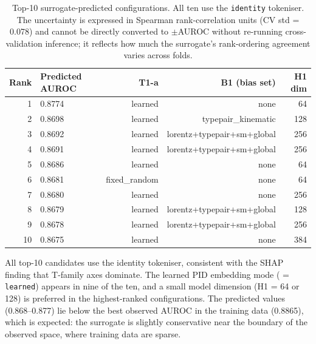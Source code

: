 \begin{table}[h]
  \centering\small
  \caption{Top-10 surrogate-predicted configurations. All ten use the
    \texttt{identity} tokeniser. The uncertainty is expressed in Spearman
    rank-correlation units (CV std = 0.078) and cannot be directly converted
    to $\pm$AUROC without re-running cross-validation inference; it reflects
    how much the surrogate's rank-ordering agreement varies across folds.}
  \label{tab:ch8_top10}
  \begin{tabular}{rlrrr}
    \toprule
    Rank & Predicted AUROC & T1-a & B1 (bias set) & H1 dim \\
    \midrule
    1  & 0.8774 & learned        & none                                                            & 64  \\
    2  & 0.8698 & learned        & typepair\_kinematic                                             & 128 \\
    3  & 0.8692 & learned        & lorentz+typepair+sm+global                                      & 256 \\
    4  & 0.8691 & learned        & lorentz+typepair+sm+global                                      & 256 \\
    5  & 0.8686 & learned        & none                                                            & 64  \\
    6  & 0.8681 & fixed\_random  & none                                                            & 64  \\
    7  & 0.8680 & learned        & none                                                            & 256 \\
    8  & 0.8679 & learned        & lorentz+typepair+sm+global                                      & 128 \\
    9  & 0.8678 & learned        & lorentz+typepair+sm+global                                      & 256 \\
    10 & 0.8675 & learned        & none                                                            & 384 \\
    \bottomrule
  \end{tabular}
\end{table}

All top-10 candidates use the identity tokeniser, consistent with the SHAP
finding that T-family axes dominate. The learned PID embedding mode
( = \texttt{learned}) appears in nine of the ten, and a small
model dimension (H1 = 64 or 128) is preferred in the highest-ranked configurations.
The predicted values (0.868--0.877) lie below the best observed AUROC in the
training data (0.8865), which is expected: the surrogate is slightly conservative
near the boundary of the observed space, where training data are sparse.

